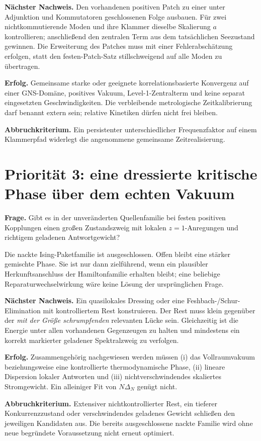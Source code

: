\textbf{Nächster Nachweis.} Den vorhandenen positiven Patch zu einer unter Adjunktion und Kommutatoren geschlossenen Folge ausbauen. Für zwei nichtkommutierende Moden und ihre Klammer dieselbe Skalierung $a$ kontrollieren; anschließend den zentralen Term aus dem tatsächlichen Seezustand gewinnen. Die Erweiterung des Patches muss mit einer Fehlerabschätzung erfolgen, statt den festen-Patch-Satz stillschweigend auf alle Moden zu übertragen.

\textbf{Erfolg.} Gemeinsame starke oder geeignete korrelationsbasierte Konvergenz auf einer GNS-Domäne, positives Vakuum, Level-1-Zentralterm und keine separat eingesetzten Geschwindigkeiten. Die verbleibende metrologische Zeitkalibrierung darf benannt extern sein; relative Kinetiken dürfen nicht frei bleiben.

\textbf{Abbruchkriterium.} Ein persistenter unterschiedlicher Frequenzfaktor auf einem Klammerpfad widerlegt die angenommene gemeinsame Zeitrealisierung.

\section{Priorität 3: eine dressierte kritische Phase über dem echten Vakuum}
\textbf{Frage.} Gibt es in der unveränderten Quellenfamilie bei festen positiven Kopplungen einen großen Zustandszweig mit lokalen $z=1$-Anregungen und richtigem geladenen Antwortgewicht?

Die nackte Ising-Paketfamilie ist ausgeschlossen. Offen bleibt eine stärker gemischte Phase. Sie ist nur dann zielführend, wenn ein plausibler Herkunftsanschluss der Hamiltonfamilie erhalten bleibt; eine beliebige Reparaturwechselwirkung wäre keine Lösung der ursprünglichen Frage.

\textbf{Nächster Nachweis.} Ein quasilokales Dressing oder eine Feshbach-/Schur-Elimination mit kontrolliertem Rest konstruieren. Der Rest muss klein gegenüber der \emph{mit der Größe schrumpfenden} relevanten Lücke sein. Gleichzeitig ist die Energie unter allen vorhandenen Gegenzeugen zu halten und mindestens ein korrekt markierter geladener Spektralzweig zu verfolgen.

\textbf{Erfolg.} Zusammengehörig nachgewiesen werden müssen (i) das Vollraumvakuum beziehungsweise eine kontrollierte thermodynamische Phase, (ii) lineare Dispersion lokaler Antworten und (iii) nichtverschwindendes skaliertes Stromgewicht. Ein alleiniger Fit von $N\Delta_N$ genügt nicht.

\textbf{Abbruchkriterium.} Extensiver nichtkontrollierter Rest, ein tieferer Konkurrenzzustand oder verschwindendes geladenes Gewicht schließen den jeweiligen Kandidaten aus. Die bereits ausgeschlossene nackte Familie wird ohne neue begründete Voraussetzung nicht erneut optimiert.

